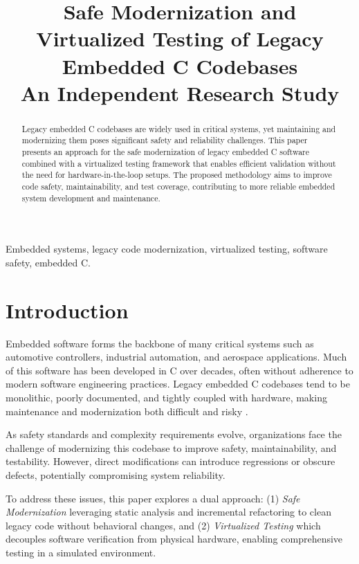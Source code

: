 \documentclass[conference]{IEEEtran}
\title{Safe Modernization and Virtualized Testing of Legacy Embedded C Codebases\\
	\large An Independent Research Study}
\author{
	\IEEEauthorblockN{Nauman Shahid}
	\IEEEauthorblockA{
		Independent Researcher \\
		\texttt{nauman.shahid@gatech.edu}
	}
}
\begin{document}
	\maketitle
	
	\begin{abstract}
		Legacy embedded C codebases are widely used in critical systems, yet maintaining and modernizing them poses significant safety and reliability challenges. This paper presents an approach for the safe modernization of legacy embedded C software combined with a virtualized testing framework that enables efficient validation without the need for hardware-in-the-loop setups. The proposed methodology aims to improve code safety, maintainability, and test coverage, contributing to more reliable embedded system development and maintenance.
	\end{abstract}
	
	\begin{IEEEkeywords}
		Embedded systems, legacy code modernization, virtualized testing, software safety, embedded C.
	\end{IEEEkeywords}
	
	\section{Introduction}
	\label{sec:intro}
	Embedded software forms the backbone of many critical systems such as automotive controllers, industrial automation, and aerospace applications. Much of this software has been developed in C over decades, often without adherence to modern software engineering practices. Legacy embedded C codebases tend to be monolithic, poorly documented, and tightly coupled with hardware, making maintenance and modernization both difficult and risky \cite{lewis2019modernizing}.
	
	As safety standards and complexity requirements evolve, organizations face the challenge of modernizing this codebase to improve safety, maintainability, and testability. However, direct modifications can introduce regressions or obscure defects, potentially compromising system reliability. 
	
	To address these issues, this paper explores a dual approach: (1) \textit{Safe Modernization} leveraging static analysis and incremental refactoring to clean legacy code without behavioral changes, and (2) \textit{Virtualized Testing} which decouples software verification from physical hardware, enabling comprehensive testing in a simulated environment.
	
\end{document}
